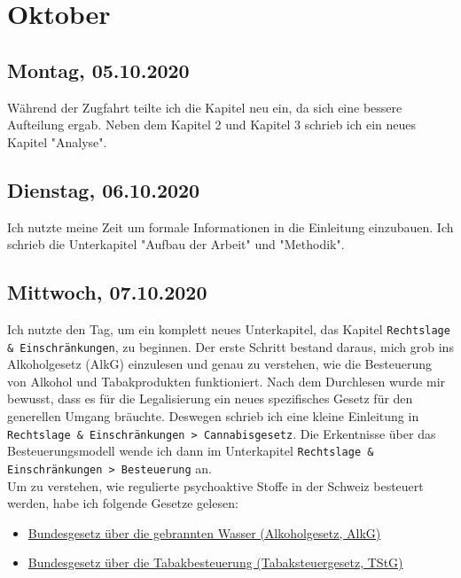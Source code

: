 \documentclass[../main.tex]{subfiles}
\begin{document}
	\section{Oktober}
	
	\subsection{Montag, 05.10.2020}
	Während der Zugfahrt teilte ich die Kapitel neu ein, da sich eine bessere Aufteilung ergab.
	Neben dem Kapitel 2 und Kapitel 3 schrieb ich ein neues Kapitel "Analyse".
	
	\subsection{Dienstag, 06.10.2020}
	Ich nutzte meine Zeit um formale Informationen in die Einleitung einzubauen.
	Ich schrieb die Unterkapitel "Aufbau der Arbeit" und "Methodik".
	
	\subsection{Mittwoch, 07.10.2020}
	Ich nutzte den Tag, um ein komplett neues Unterkapitel, das Kapitel \texttt{Rechtslage \& Einschränkungen}, zu beginnen. 
	Der erste Schritt bestand daraus, mich grob ins Alkoholgesetz (AlkG) einzulesen und genau zu verstehen, wie die Besteuerung von Alkohol und Tabakprodukten funktioniert. 
	Nach dem Durchlesen wurde mir bewusst, dass es für die Legalisierung ein neues spezifisches Gesetz für den generellen Umgang bräuchte. Deswegen schrieb ich eine kleine Einleitung in \texttt{Rechtslage \& Einschränkungen > Cannabisgesetz}.
	Die Erkentnisse über das Besteuerungsmodell wende ich dann im Unterkapitel \texttt{Rechtslage \& Einschränkungen > Besteuerung} an.\\
	
	\noindent	
	Um zu verstehen, wie regulierte psychoaktive Stoffe in der Schweiz besteuert werden, habe ich folgende Gesetze gelesen:
	
	\begin{itemize}
		\item \href{https://www.admin.ch/opc/de/classified-compilation/19320035/index.html}{Bundesgesetz über die gebrannten Wasser (Alkoholgesetz, AlkG)}
		\item \href{https://www.admin.ch/opc/de/classified-compilation/19690056/index.html}{Bundesgesetz über die Tabakbesteuerung (Tabaksteuergesetz, TStG)}
	\end{itemize}
	
\end{document}
